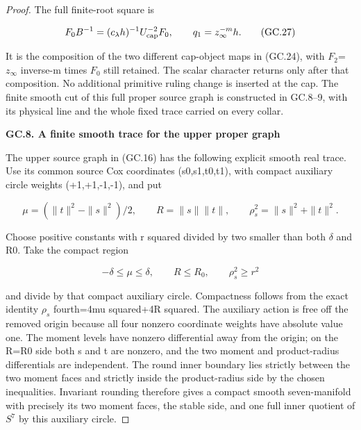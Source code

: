 \begin{proof}
The full finite-root square is

\[
 F_0B^{-1}=(c_\lambda h)^{-1}U_{\rm cap}^{-2}F_0,
                    \qquad q_1=z_\infty^{-m}h.
 \tag{GC.27}
\]

It is the composition of the two different cap-object maps
in (GC.24), with \(F_2\)=\(z_{\infty}\) inverse-m times \(F_0\) still retained.
The scalar character returns only after that composition.
No additional primitive ruling change is inserted at the cap.
The finite smooth cut of this full proper source graph is
constructed in GC.8--9, with its physical line and the whole
fixed trace carried on every collar.

\par

\medskip\noindent\textbf{GC.8. A finite smooth trace for the upper proper graph}

\par\nobreak

The upper source graph in (GC.16) has the following explicit
smooth real trace. Use its common source Cox coordinates
(s0,s1,t0,t1), with compact auxiliary circle weights
(+1,+1,-1,-1), and put

\[
 \mu=(\|t\|^2-\|s\|^2)/2,\qquad R=\|s\|\|t\|,
                  \qquad \rho_s^2=\|s\|^2+\|t\|^2.
 \tag{GC.28}
\]

Choose positive constants with r squared divided by two smaller
than both \(\delta\) and R0. Take the compact region

\[
 -\delta\le\mu\le\delta,\qquad R\le R_0,
                         \qquad \rho_s^2\ge r^2
 \tag{GC.29}
\]

and divide by that compact auxiliary circle. Compactness follows
from the exact identity \(\rho_{s}\) fourth=4mu squared+4R squared.
The auxiliary action is free off the removed origin because all
four nonzero coordinate weights have absolute value one. The
moment levels have nonzero differential away from the origin;
on the R=R0 side both s and t are nonzero, and the two moment
and product-radius differentials are independent. The round
inner boundary lies strictly between the two moment faces and
strictly inside the product-radius side by the chosen inequalities.
Invariant rounding therefore gives a compact smooth seven-manifold
with precisely its two moment faces, the stable side, and one
full inner quotient of \(S^7\) by this auxiliary circle.


\end{proof}

